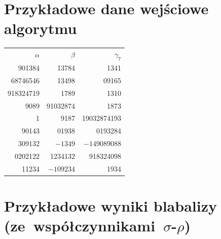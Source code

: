 \documentclass[licencjacka]{pracamgr}
\begin{document}
\chapter{Przykładowe dane wejściowe algorytmu}

\begin{center}
  \begin{tabular}{rrr}
    $\alpha$ & $\beta$ & $\gamma_7$ \\
    901384 & 13784 & 1341\\
    68746546 & 13498& 09165\\
    918324719& 1789 & 1310 \\
    9089 & 91032874& 1873 \\
    1 & 9187 & 19032874193 \\
    90143 & 01938 & 0193284 \\
    309132 & $-1349$ & $-149089088$ \\
    0202122 & 1234132 & 918324098 \\
    11234 & $-109234$ & 1934 \\
  \end{tabular}
\end{center}

\chapter{Przykładowe wyniki blabalizy
    (ze~współczynnikami~$\sigma$-$\rho$)}
\end{document}
